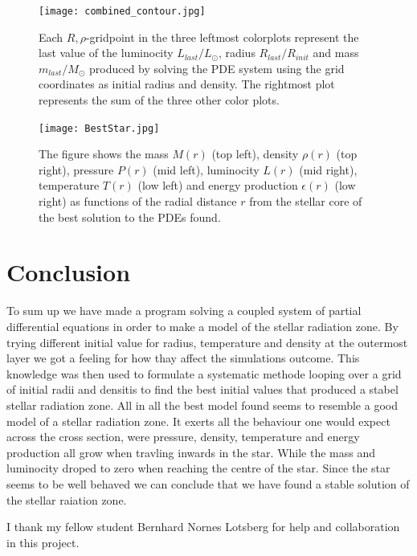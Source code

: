 \documentclass{emulateapj}
\begin{document}
	\begin{figure}
		\texttt{[image: combined\_contour.jpg]}
		\caption{Each $R,\rho$-gridpoint in the three leftmost colorplots represent the last value of the luminocity $L_{last}/L_\odot$, radius $R_{last}/R_{init}$ and mass $m_{last}/M_\odot$ produced by solving the PDE system using the grid coordinates as initial radius and density. The rightmost plot represents the sum of the three other color plots.} 	
		\label{fig:colorplot}
	\end{figure}
	
	\begin{figure}
		\texttt{[image: BestStar.jpg]}
		\caption{The figure shows the mass $M(r)$ (top left), density $\rho(r)$ (top right), pressure $P(r)$ (mid left), luminocity $L(r)$ (mid right), temperature $T(r)$ (low left) and energy production $\epsilon(r)$ (low right) as functions of the radial distance $r$ from the stellar core of the best solution to the PDEs found.}
		\label{fig:beststar}
	\end{figure}
	\newpage
	\section*{Conclusion}
	To sum up we have made a program solving a coupled system of partial differential equations in order to make a model of the stellar radiation zone. By trying different initial value for radius, temperature and density at the outermost layer we got a feeling for how thay affect the simulations outcome. This knowledge was then used to formulate a systematic methode looping over a grid of initial radii and densitis to find the best initial values that produced a stabel stellar radiation zone. All in all the best model found seems to resemble a good model of a stellar radiation zone. It exerts all the behaviour one would expect across the cross section, were pressure, density, temperature and energy production all grow when travling inwards in the star. While the mass and luminocity droped to zero when reaching the centre of the star. Since the star seems to be well behaved we can conclude that we have found a stable solution of the stellar raiation zone.
	
	
	
	
	
	\begin{acknowledgements}
		I thank my fellow student Bernhard Nornes Lotsberg for help and collaboration in this project.
	\end{acknowledgements}
\end{document}
